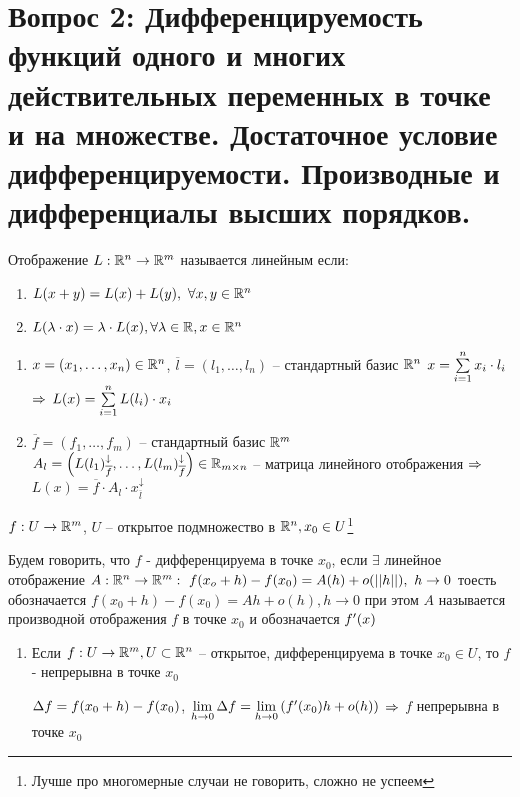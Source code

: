 \section{Вопрос 2: Дифференцируемость функций одного и многих действительных переменных
в точке и на множестве. Достаточное условие дифференцируемости.
Производные и дифференциалы высших порядков.}



\begin{defs}
	Отображение $L: \mathbb{R}^n\to\mathbb{R}^m$ называется линейным если:
	\begin{enumerate}
		\item $L(x+y)= L(x) + L(y), \ \forall x,y \in \mathbb{R}^n$
		\item $L(\lambda \cdot x) = \lambda \cdot L(x), \forall
		\lambda \in \mathbb{R},  x\in \mathbb{R}^n$
	\end{enumerate}

	\begin{enumerate}
		\item $x = (x_1, \ldots, x_n) \in \mathbb{R}^n$, $\overline{l} = (l_1,\ldots,l_n)$ -- стандартный базис $\mathbb{R}^n$ $x = \sum\limits_{i=1}^{n}x_i \cdot l_i$ $\Rightarrow$ $L(x) = \sum\limits_{i=1}^{n}L(l_i)\cdot x_i$

		\item $\overline{f}= (f_1,\ldots,f_m)$ -- стандартный базис $\mathbb{R}^m$ $A_l = \left( L(l_1)^{\downarrow}_{\overline{f}},\ldots,L(l_m)^{\downarrow}_{\overline{f}}\right) \in \mathbb{R}_{m \times n}$ -- матрица линейного отображения $\Rightarrow$ $L(x) = \overline{f} \cdot A_l \cdot x_{\overline{l}}^{\downarrow}$
	\end{enumerate}
\end{defs}

\begin{defs}
	$f: U \to \mathbb{R}^m$, $U$ -- открытое подмножество в $\mathbb{R}^n, x_0 \in U$\footnote{Лучше про многомерные случаи не говорить, сложно не успеем}

	Будем говорить, что $f$ - дифференцируема в точке $x_0$, если $\exists$ линейное отображение $A: \mathbb{R}^n \to \mathbb{R}^m: \ f(x_o + h) - f(x_0)= A(h) + o(\left|\left| h\right|\right|), \ h \to 0$ тоесть обозначается $f(x_0 + h)-f(x_0)=Ah+o(h), h\to 0$ при этом $A$ называется производной отображения $f$ в точке $x_0$ и обозначается $f^{\prime}(x)$
\end{defs}

\begin{claim}
	\begin{enumerate}
		\item Если $f: U \to \mathbb{R}^m, U \subset \mathbb{R}^n$ -- открытое, дифференцируема в точке $x_0 \in U$, то $f$ - непрерывна в точке $x_0$
		\begin{dokvo}
			$\Delta f = f(x_0 + h) - f(x_0)$, $\lim\limits_{h \to 0} \Delta f = \lim\limits_{h \to 0}\left( f^{\prime}(x_0)h + o(h)\right)$ $\Rightarrow$ $f$ непрерывна в точке $x_0$
		\end{dokvo}
	\end{enumerate}
\end{claim}

